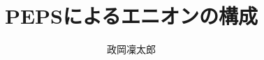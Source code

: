 \documentclass[12pt]{ltjsarticle}
\newcommand{\∩}[1]{
  \vcenter{\hbox{\scriptsize$#1$}}
}
\numberwithin{equation}{section}
\begin{document}
\title{PEPSによるエニオンの構成}
\author{政岡凜太郎}
\maketitle

\tableofcontents
\newpage

\newpage

\newpage

\newpage

% 
\newpage
\appendix
\def\thesection{\Alph{section}}

\newpage
\printbibliography
\end{document}
